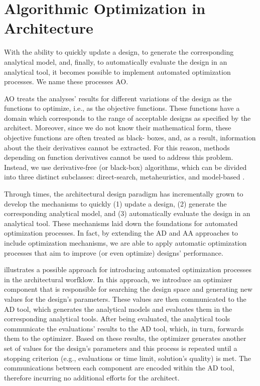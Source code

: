 \section{Algorithmic Optimization in Architecture}
\label{sec: Methodology}

With the ability to quickly update a design, to generate the corresponding analytical model, and, finally, to automatically evaluate the design in an analytical tool, it becomes possible to implement automated optimization processes. We name these processes \ac{AO}.

\ac{AO} treats the analyses' results for different variations of the design as the functions to optimize, i.e., as the objective functions. These functions have a domain which corresponds to the range of acceptable designs as specified by the architect. Moreover, since we do not know their mathematical form, these objective functions are often treated as black- boxes, and, as a result, information about the their derivatives cannot be extracted. For this reason, methods depending on function derivatives cannot be used to address this problem. Instead, we use derivative-free (or black-box) algorithms, which can be divided into three distinct subclasses: direct-search, metaheuristics, and model-based \cite{Conn2009,Glover2003Metaheuristics,Koziel2011}.



Through times, the architectural design paradigm has incrementally grown to develop the mechanisms to quickly (1) update a design, (2) generate the corresponding analytical model, and (3) automatically evaluate the design in an analytical tool. These mechanisms laid down the foundations for automated optimization processes. In fact, by extending the \ac{AD} and \ac{AA} approaches to include optimization mechanisms, we are able to apply automatic optimization processes that aim to improve (or even optimize) designs' performance. 

 illustrates a possible approach for introducing automated optimization processes in the architectural worfklow. In this approach, we introduce an optimizer component that is responsible for searching the design space and generating new values for the design's parameters. These values are then communicated to the \ac{AD} tool, which generates the analytical models and evaluates them in the corresponding analytical tools. After being evaluated, the analytical tools communicate the evaluations' results to the \ac{AD} tool, which, in turn, forwards them to the optimizer. Based on these results, the optimizer generates another set of values for the design's parameters and this process is repeated until a stopping criterion (e.g., evaluations or time limit, solution's quality) is met. The communications between each component are encoded within the \ac{AD} tool, therefore incurring no additional efforts for the architect.

